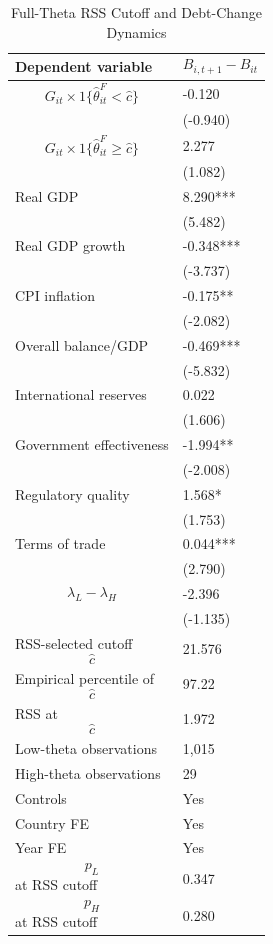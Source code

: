\begin{table}[H]\centering
\begin{threeparttable}
\caption{Full-Theta RSS Cutoff and Debt-Change Dynamics}
\label{tab:deltaB_rss_cutoff_fulltheta}
\scriptsize
\begin{tabularx}{\textwidth}{lY}
\toprule
Dependent variable & $$B_{i,t+1}-B_{it}$$ \\
\midrule
$$G_{it}\times 1\{\widehat{\theta}^{F}_{it}<\widehat{c}\}$$ & -0.120 \\
 & (-0.940) \\
$$G_{it}\times 1\{\widehat{\theta}^{F}_{it}\geq\widehat{c}\}$$ & 2.277 \\
 & (1.082) \\
Real GDP & 8.290*** \\
 & (5.482) \\
Real GDP growth & -0.348*** \\
 & (-3.737) \\
CPI inflation & -0.175** \\
 & (-2.082) \\
Overall balance/GDP & -0.469*** \\
 & (-5.832) \\
International reserves & 0.022 \\
 & (1.606) \\
Government effectiveness & -1.994** \\
 & (-2.008) \\
Regulatory quality & 1.568* \\
 & (1.753) \\
Terms of trade & 0.044*** \\
 & (2.790) \\
$$\lambda_L-\lambda_H$$ & -2.396 \\
 & (-1.135) \\
\midrule
RSS-selected cutoff $$\widehat{c}$$ & 21.576 \\
Empirical percentile of $$\widehat{c}$$ & 97.22 \\
RSS at $$\widehat{c}$$ & 1.972 \\
Low-theta observations & 1,015 \\
High-theta observations & 29 \\
Controls & Yes \\
Country FE & Yes \\
Year FE & Yes \\
$$p_L$$ at RSS cutoff & 0.347 \\
$$p_H$$ at RSS cutoff & 0.280 \\

\end{tabularx}
\end{threeparttable}
\end{table}
